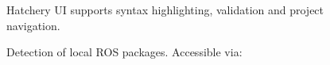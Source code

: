 \documentclass[12pt,initial,twoside,maitrise]{dms}
\numberwithin{equation}{section}
\numberwithin{table}{chapter}
\numberwithin{figure}{chapter}
\begin{document}
\begin{figure}[b]
    \centering
    \caption{Hatchery UI supports syntax highlighting, validation and project navigation.}
    \label{fig:hatchery_gui}
\end{figure}

\begin{figure}
    \centering
    \caption{Detection of local ROS packages. Accessible via: }
    \label{fig:ros_settings}
\end{figure}
\end{document}
